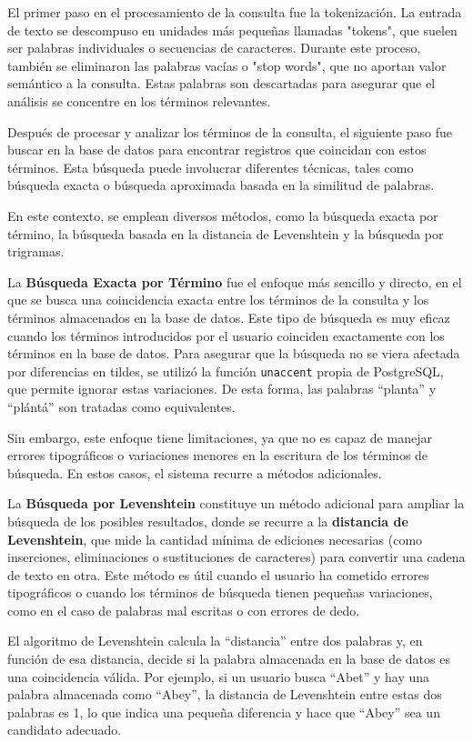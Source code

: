 El primer paso en el procesamiento de la consulta fue la tokenización. La entrada de texto se descompuso en unidades más pequeñas llamadas "tokens", 
que suelen ser palabras individuales o secuencias de caracteres. Durante este proceso, también se eliminaron las palabras vacías o "stop words", que 
no aportan valor semántico a la consulta. Estas palabras son descartadas para asegurar que el análisis se concentre en los términos relevantes.

Después de procesar y analizar los términos de la consulta, el siguiente paso fue buscar en la base de datos para encontrar registros 
que coincidan con estos términos. Esta búsqueda puede involucrar diferentes técnicas, tales como búsqueda 
exacta o búsqueda aproximada basada en la similitud de palabras.

En este contexto, se emplean diversos métodos, como la búsqueda exacta por término, la búsqueda basada en la distancia de Levenshtein y la búsqueda por trigramas.

La \textbf{Búsqueda Exacta por Término} fue el enfoque más sencillo y directo, en el que se busca una coincidencia exacta entre los términos de la consulta y los términos almacenados en 
la base de datos. Este tipo de búsqueda es muy eficaz cuando los términos introducidos por el usuario coinciden exactamente con los términos en la base de datos. 
Para asegurar que la búsqueda no se viera afectada por diferencias en tildes, se utilizó la función \texttt{unaccent} propia de PostgreSQL, que permite ignorar estas variaciones. 
De esta forma, las palabras ``planta'' y ``plántá'' son tratadas como equivalentes.

Sin embargo, este enfoque tiene limitaciones, ya que no es capaz de manejar errores tipográficos o variaciones menores en la escritura de los términos de búsqueda. 
En estos casos, el sistema recurre a métodos adicionales.

La \textbf{Búsqueda por Levenshtein} constituye un método adicional para ampliar la búsqueda de los posibles resultados, donde se recurre a la \textbf{distancia de Levenshtein}, que mide la cantidad mínima de ediciones necesarias 
(como inserciones, eliminaciones o sustituciones de caracteres) para convertir una cadena de texto en otra. Este método es útil cuando el usuario ha cometido errores 
tipográficos o cuando los términos de búsqueda tienen pequeñas variaciones, como en el caso de palabras mal escritas o con errores de dedo.

El algoritmo de Levenshtein calcula la ``distancia'' entre dos palabras y, en función de esa distancia, decide si la palabra almacenada en la base de datos es una 
coincidencia válida. Por ejemplo, si un usuario busca ``Abet'' y hay una palabra almacenada como ``Abey'', la distancia de Levenshtein entre estas dos palabras es 1, 
lo que indica una pequeña diferencia y hace que ``Abey'' sea un candidato adecuado.

